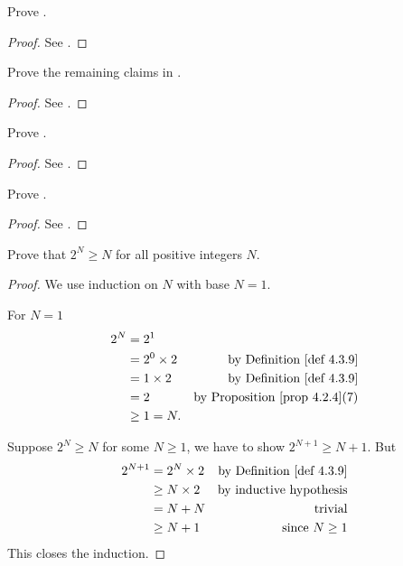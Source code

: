 \exercisesection
\begin{exercise} \label{exercise 4.3.1}
Prove .
\end{exercise}

\begin{proof}
See .
\end{proof}

\begin{exercise} \label{exercise 4.3.2}
Prove the remaining claims in .
\end{exercise}

\begin{proof}
See .
\end{proof}

\begin{exercise} \label{exercise 4.3.3}
Prove .
\end{exercise}

\begin{proof}
See .
\end{proof}

\begin{exercise}
Prove .
\end{exercise}

\begin{proof}
See .
\end{proof}

\begin{exercise} \label{exercise 4.3.5}
Prove that \(2^N \geq N\) for all positive integers \(N\).
\end{exercise}

\begin{proof}
We use induction on \(N\) with base \(N = 1\).

For \(N = 1\)
\begin{align*}
    2^N & = 2^1 \\
        & = 2^0 \X 2 & \text{by \DEF{4.3.9}} \\
        & = 1 \X 2 & \text{by \DEF{4.3.9}} \\
        & = 2 & \text{by \PROP{4.2.4}(7)} \\
        & \ge 1 = N.
\end{align*}

Suppose \(2^N \ge N\) for some \(N \ge 1\), we have to show \(2^{N + 1} \ge N + 1\).
But
\begin{align*}
    2^{N + 1} & = 2^N \X 2 & \text{by \DEF{4.3.9}} \\
              & \ge N \X 2 & \text{by inductive hypothesis} \\
              & = N + N & \text{trivial} \\
              & \ge N + 1 & \text{since \(N \ge 1\)}
\end{align*}
This closes the induction.
\end{proof}